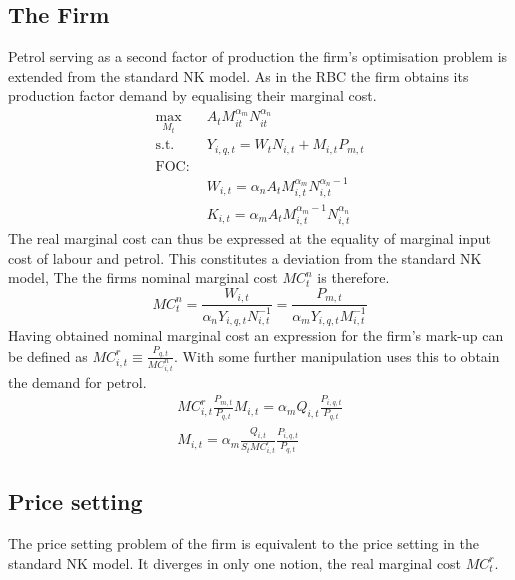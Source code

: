 \documentclass[12pt,a4paper,english]{article} %
\begin{document}
	\subsection{The Firm}
	Petrol serving as a second factor of production the firm's optimisation problem is extended from the standard NK model. As in the RBC the firm obtains its production factor demand by equalising their marginal cost.  
	\begin{equation}
		\begin{aligned}
			\max_{M_t} \quad & A_t M_{it}^{\alpha_m} N_{it}^{\alpha_n} \\
			\textrm{s.t.} \quad & Y_{i,q,t} = W_t N_{i,t} + M_{i,t} P_{m,t}\\
			\textrm{FOC:} \\
			\quad & W_{i,t} = \alpha_n A_t M_{i,t}^{\alpha_m} N_{i,t}^{\alpha_n -1}\\
			\quad & K_{i,t} = \alpha_m A_t M_{i,t}^{\alpha_m -1} N_{i,t}^{\alpha_n}
		\end{aligned}
	\end{equation}
	The real marginal cost can thus be expressed at the equality of marginal input cost of labour and petrol. This constitutes a deviation from the standard NK model,  The the firms nominal marginal cost $MC_{t}^n$ is therefore.
	\begin{equation}
		MC_t^n = \frac{W_{i,t}}{\alpha_n Y_{i,q,t} N_{i,t}^{-1}} = \frac{P_{m,t}}{\alpha_m Y_{i,q,t} M_{i,t}^{-1}}
	\end{equation}
	Having obtained nominal marginal cost an expression for the firm's mark-up can be defined as $MC_{i,t}^r \equiv \frac{P_{q,t}}{MC_{i,t}^n}$. With some further manipulation \cite{blanchard_macroeconomic_2007} uses this to obtain the demand for petrol.
	\begin{equation}
		\begin{aligned}
		MC_{i,t}^r \frac{P_{m,t}}{P_{q,t}} M_{i,t} = \alpha_m Q_{i,t} \frac{P_{i,q,t}}{P_{q,t}} \\
		M_{i,t} = \alpha_m \frac{Q_{i,t}}{S_t MC_{i,t}^r} \frac{P_{i,q,t}}{P_{q,t}}
	\end{aligned}
	\end{equation}

	\subsection{Price setting}
	The price setting problem of the firm is equivalent to the price setting in the standard NK model. It diverges in only one notion, the real marginal cost $MC_t^r$. \\
	
\end{document}
